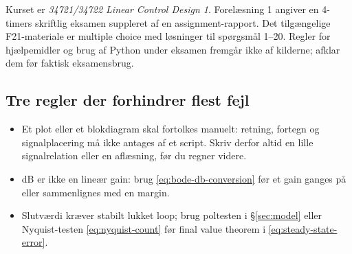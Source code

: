Kurset er \emph{34721/34722 Linear Control Design 1}. Forelæsning 1 angiver en
4-timers skriftlig eksamen suppleret af en assignment-rapport. Det tilgængelige
F21-materiale er multiple choice med løsninger til spørgsmål 1--20. Regler for
hjælpemidler og brug af Python under eksamen fremgår ikke af kilderne; afklar dem
før faktisk eksamensbrug.

\subsection{Tre regler der forhindrer flest fejl}

\begin{itemize}
\item Et plot eller et blokdiagram skal fortolkes manuelt: retning, fortegn og signalplacering
      må ikke antages af et script. Skriv derfor altid en lille signalrelation eller en
      aflæsning, før du regner videre.
\item dB er ikke en lineær gain: brug \eqref{eq:bode-db-conversion} før et gain ganges
      på eller sammenlignes med en margin.
\item Slutværdi kræver stabilt lukket loop; brug poltesten i \S\ref{sec:model} eller
      Nyquist-testen \eqref{eq:nyquist-count} før final value theorem i
      \eqref{eq:steady-state-error}.
\end{itemize}
